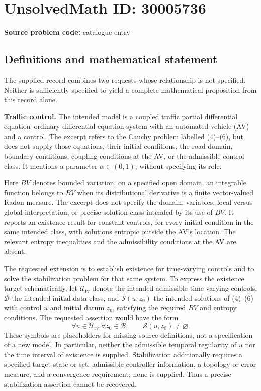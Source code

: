 \documentclass[11pt]{article}
\begin{document}
\section*{UnsolvedMath ID: 30005736}
\textbf{Source problem code:} catalogue entry
\subsection{Definitions and mathematical statement}
The supplied record combines two requests whose relationship is not specified. Neither is sufficiently specified to yield a complete mathematical proposition from this record alone.

\textbf{Traffic control.} The intended model is a coupled traffic partial differential equation--ordinary differential equation system with an automated vehicle (AV) and a control. The excerpt refers to the Cauchy problem labelled (4)--(6), but does not supply those equations, their initial conditions, the road domain, boundary conditions, coupling conditions at the AV, or the admissible control class. It mentions a parameter \(\alpha\in(0,1)\), without specifying its role.

Here \(BV\) denotes bounded variation: on a specified open domain, an integrable function belongs to \(BV\) when its distributional derivative is a finite vector-valued Radon measure. The excerpt does not specify the domain, variables, local versus global interpretation, or precise solution class intended by its use of \(BV\). It reports an existence result for constant controls, for every initial condition in the same intended class, with solutions entropic outside the AV's location. The relevant entropy inequalities and the admissibility conditions at the AV are absent.

The requested extension is to establish existence for time-varying controls and to solve the stabilization problem for that same system. To express the existence target schematically, let \(\mathcal U_{\mathrm{tv}}\) denote the intended admissible time-varying controls, \(\mathcal B\) the intended initial-data class, and \(\mathcal S(u,z_0)\) the intended solutions of (4)--(6) with control \(u\) and initial datum \(z_0\), satisfying the required \(BV\) and entropy conditions. The requested assertion would have the form
\[
  \forall u\in\mathcal U_{\mathrm{tv}}\;\forall z_0\in\mathcal B,
  \qquad \mathcal S(u,z_0)\ne\varnothing.
\]
These symbols are placeholders for missing source definitions, not a specification of a new model. In particular, neither the admissible temporal regularity of \(u\) nor the time interval of existence is supplied. Stabilization additionally requires a specified target state or set, admissible controller information, a topology or error measure, and a convergence requirement; none is supplied. Thus a precise stabilization assertion cannot be recovered.
\end{document}
